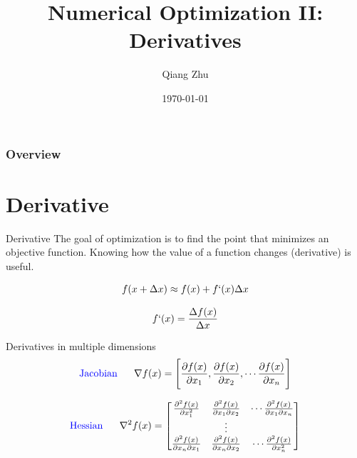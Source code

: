 \documentclass{beamer}
\title[Optimization]{Numerical Optimization II: Derivatives} %
\author{Qiang Zhu} %
\institute[University of Nevada Las Vegas] %
{
University of Nevada Las Vegas\\ %
\medskip
}
\date{\today} %
\begin{document}
\begin{frame}
\titlepage %
\end{frame}

\begin{frame}
\frametitle{Overview} %
\tableofcontents %
\end{frame}



\section{Derivative}
\begin{frame}{Derivative}
The goal of optimization is to find the point that minimizes an objective function. Knowing how the value of a function changes (derivative) is useful.

 \begin{equation*}
     f(x + \Delta x) \approx f(x) + f`(x)\Delta x
 \end{equation*}
 
\begin{equation*}
    f`(x) = \frac{\Delta f(x)}{\Delta x}
\end{equation*}

Derivatives in multiple dimensions
\begin{equation*}
\textrm{\textcolor{blue}{Jacobian}}~~~~~     \nabla f(x) = \Bigg[\frac{\partial f(x)}{\partial x_1}, \frac{\partial f(x)}{\partial x_2},  \cdots \frac{\partial f(x)}{\partial x_n} \Bigg]
\end{equation*}

\begin{equation*}
\textrm{\textcolor{blue}{Hessian}}~~~~~    \nabla^2 f(x) = 
    \begin{bmatrix}
\frac{\partial^2 f(x)}{\partial x_1^2 } & \frac{\partial^2 f(x)}{\partial x_1 \partial x_2 } & \cdots \frac{\partial^2 f(x)}{\partial x_1 \partial x_n }\\
 & \vdots & \\
\frac{\partial^2 f(x)}{\partial x_n \partial x_1} & \frac{\partial^2 f(x)}{\partial x_n \partial x_2 } & \cdots \frac{\partial^2 f(x)}{\partial x_n^2 } \\
\end{bmatrix}
\end{equation*}
\end{frame}
\end{document}
